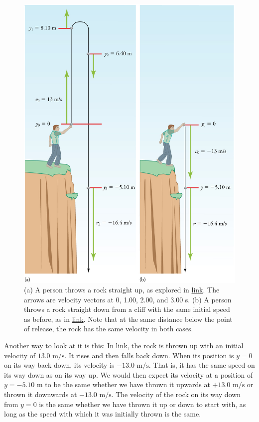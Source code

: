 \documentclass[
]{book}
\begin{document}
\begin{figure}
\hypertarget{import-auto-id4173440}{%
\centering
\includegraphics{images/Figure_02_06_00b.jpg}
\caption{(a) A person throws a rock straight up, as explored in
\protect\hyperlink{fs-id4067058}{link}. The arrows are velocity
vectors at 0, 1.00, 2.00, and 3.00 s. (b) A person throws a rock
straight down from a cliff with the same initial speed as before, as in
\protect\hyperlink{fs-id2186600}{link}. Note that at the same
distance below the point of release, the rock has the same velocity in
both cases.}\label{import-auto-id4173440}
}
\end{figure}

Another way to look at it is this: In
\protect\hyperlink{fs-id4067058}{link}, the rock is thrown up
with an initial velocity of \({\text{13}\text{.0\ m/s}}{}\). It rises and
then falls back down. When its position is \(y = 0\) on its way back down,
its velocity is \({{- \text{13}}\text{.0\ m/s}}{}\). That is, it has the
same speed on its way down as on its way up. We would then expect its
velocity at a position of \({{y = {- 5}}\text{.}\text{10\ m}}{}\) to be
the same whether we have thrown it upwards at
\({+ \text{13}}\text{.0\ m/s}\) or thrown it downwards at
\({- \text{13}}\text{.0\ m/s}\). The velocity of the rock on its way down
from \(y = 0\) is the same whether we have thrown it up or down to start
with, as long as the speed with which it was initially thrown is the
same.
\end{document}

